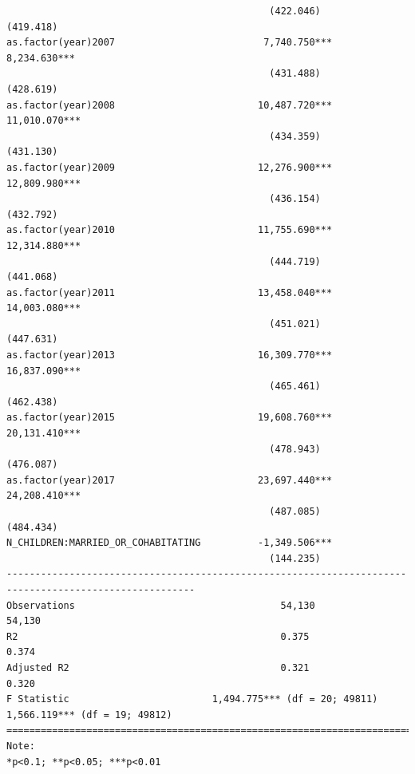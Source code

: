 \documentclass[
]{article}
\begin{document}
\begin{verbatim}
                                              (422.046)                          (419.418)             
as.factor(year)2007                          7,740.750***                      8,234.630***            
                                              (431.488)                          (428.619)             
as.factor(year)2008                         10,487.720***                      11,010.070***           
                                              (434.359)                          (431.130)             
as.factor(year)2009                         12,276.900***                      12,809.980***           
                                              (436.154)                          (432.792)             
as.factor(year)2010                         11,755.690***                      12,314.880***           
                                              (444.719)                          (441.068)             
as.factor(year)2011                         13,458.040***                      14,003.080***           
                                              (451.021)                          (447.631)             
as.factor(year)2013                         16,309.770***                      16,837.090***           
                                              (465.461)                          (462.438)             
as.factor(year)2015                         19,608.760***                      20,131.410***           
                                              (478.943)                          (476.087)             
as.factor(year)2017                         23,697.440***                      24,208.410***           
                                              (487.085)                          (484.434)             
N_CHILDREN:MARRIED_OR_COHABITATING          -1,349.506***                                              
                                              (144.235)                                                
-------------------------------------------------------------------------------------------------------
Observations                                    54,130                            54,130               
R2                                              0.375                              0.374               
Adjusted R2                                     0.321                              0.320               
F Statistic                         1,494.775*** (df = 20; 49811)      1,566.119*** (df = 19; 49812)   
=======================================================================================================
Note:                                                                       *p<0.1; **p<0.05; ***p<0.01
\end{verbatim}
\end{document}
